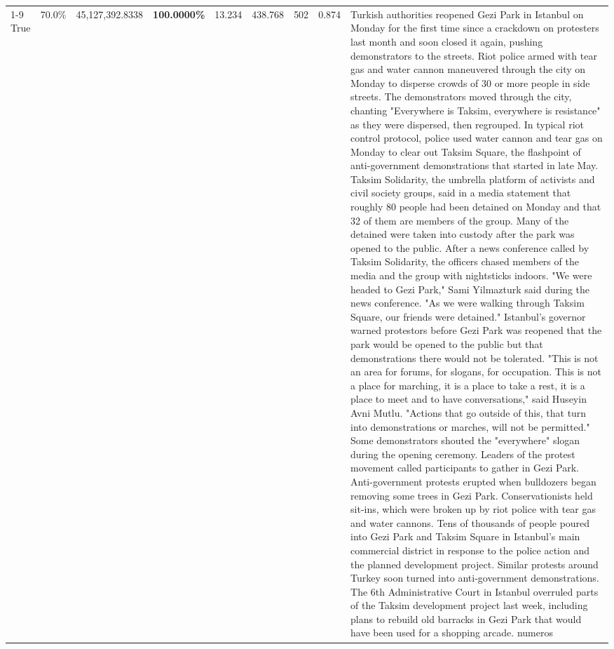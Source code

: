 \begin{table}[H]
\begin{tabular}{lllrlllll}
\cline{1-9}
True & 70.0\% & 45,127,392.8338 & \bfseries \color{red} 100.0000\% & 13.234 & 438.768 & 502 & 0.874 & Turkish authorities reopened Gezi Park in Istanbul on Monday for the first time since a crackdown on protesters last month and soon closed it again, pushing demonstrators to the streets. Riot police armed with tear gas and water cannon maneuvered through the city on Monday to disperse crowds of 30 or more people in side streets. The demonstrators moved through the city, chanting "Everywhere is Taksim, everywhere is resistance" as they were dispersed, then regrouped. In typical riot control protocol, police used water cannon and tear gas on Monday to clear out Taksim Square, the flashpoint of anti-government demonstrations that started in late May. Taksim Solidarity, the umbrella platform of activists and civil society groups, said in a media statement that roughly 80 people had been detained on Monday and that 32 of them are members of the group. Many of the detained were taken into custody after the park was opened to the public. After a news conference called by Taksim Solidarity, the officers chased members of the media and the group with nightsticks indoors. "We were headed to Gezi Park," Sami Yilmazturk said during the news conference. "As we were walking through Taksim Square, our friends were detained." Istanbul's governor warned protestors before Gezi Park was reopened that the park would be opened to the public but that demonstrations there would not be tolerated. "This is not an area for forums, for slogans, for occupation. This is not a place for marching, it is a place to take a rest, it is a place to meet and to have conversations," said Huseyin Avni Mutlu. "Actions that go outside of this, that turn into demonstrations or marches, will not be permitted." Some demonstrators shouted the "everywhere" slogan during the opening ceremony. Leaders of the protest movement called participants to gather in Gezi Park. Anti-government protests erupted when bulldozers began removing some trees in Gezi Park. Conservationists held sit-ins, which were broken up by riot police with tear gas and water cannons. Tens of thousands of people poured into Gezi Park and Taksim Square in Istanbul's main commercial district in response to the police action and the planned development project. Similar protests around Turkey soon turned into anti-government demonstrations. The 6th Administrative Court in Istanbul overruled parts of the Taksim development project last week, including plans to rebuild old barracks in Gezi Park that would have been used for a shopping arcade. numeros \\

\end{tabular}
\end{table}
